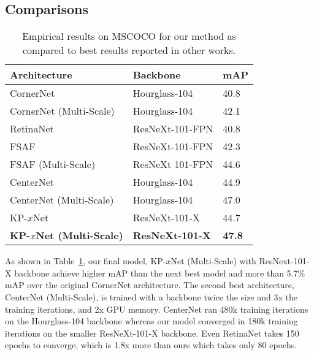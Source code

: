 \documentclass[10pt,twocolumn,letterpaper]{article}
\begin{document}
\subsection{Comparisons}
\vspace{-0.25cm}
\begin{table}[]
\caption{Empirical results on MSCOCO for our method as compared to best results reported in other works.}
\begin{tabular}{@{}lll@{}}
 \hline
\textbf{Architecture}              & \textbf{Backbone}      & \textbf{mAP}  \\
 \hline
CornerNet \cite{law2018cornernet}                         & Hourglass-104           & 40.8          \\
CornerNet (Multi-Scale)   \cite{law2018cornernet}           & Hourglass-104           & 42.1          \\
RetinaNet  \cite{lin2017focal}                        & ResNeXt-101-FPN        & 40.8          \\
FSAF \cite{zhu2019feature}                              & ResNeXt-101-FPN        & 42.3          \\
FSAF (Multi-Scale) \cite{zhu2019feature}                & ResNeXt 101-FPN        & 44.6          \\
CenterNet \cite{duan2019centernet}                       & Hourglass-104           & 44.9          \\
CenterNet (Multi-Scale) \cite{duan2019centernet}         & Hourglass-104           & 47.0          \\  \hline
KP-$x$Net                            & ResNeXt-101-X          & 44.7 \\ 
\textbf{KP-$x$Net (Multi-Scale)}     & \textbf{ResNeXt-101-X}   & \textbf{47.8}   \\ 
\hline
\end{tabular}

\label{table:results}
\vspace{-0.5cm}
\end{table}

As shown in Table~\ref{table:results}, our final model, KP-$x$Net (Multi-Scale) with ResNext-101-X backbone achieve higher mAP than the next best model and more than 5.7\% mAP over the original CornerNet architecture. The second best architecture, CenterNet (Multi-Scale), is trained with a backbone twice the size and 3x the training iterations, and 2x GPU memory. CenterNet ran 480k training iterations on the Hourglass-104 backbone whereas our model converged in 180k training iterations on the smaller ResNeXt-101-X backbone. Even RetinaNet takes 150 epochs to converge, which is 1.8x more than ours which takes only 80 epochs. 
  
\end{document}
